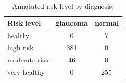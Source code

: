 \begin{table}[t]
\centering
\caption{Annotated risk level by diagnosis.}
\label{tab:risk}
\begin{tabular}{lcc}
\toprule
Risk level & glaucoma & normal \\
\midrule
healthy & 0 & 7 \\
high risk & 381 & 0 \\
moderate risk & 46 & 0 \\
very healthy & 0 & 255 \\
\bottomrule
\end{tabular}
\end{table}